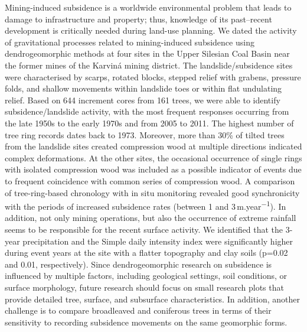 {Mining-induced subsidence is a worldwide environmental problem that leads to damage to infrastructure and property; thus, knowledge of its past–recent development is critically needed during land-use planning. We dated the activity of gravitational processes related to mining-induced subsidence using dendrogeomorphic methods at four sites in the Upper Silesian Coal Basin near the former mines of the Karviná mining district. The landslide/subsidence sites were characterised by scarps, rotated blocks, stepped relief with grabens, pressure folds, and shallow movements within landslide toes or within flat undulating relief. Based on 644 increment cores from 161 trees, we were able to identify subsidence/landslide activity, with the most frequent responses occurring from the late 1950s to the early 1970s and from 2005 to 2011. The highest number of tree ring records dates back to 1973. Moreover, more than 30\% of tilted trees from the landslide sites created compression wood at multiple directions indicated complex deformations. At the other sites, the occasional occurrence of single rings with isolated compression wood was included as a possible indicator of events due to frequent coincidence with common series of compression wood. A comparison of tree-ring-based chronology with in situ monitoring revealed good synchronicity with the periods of increased subsidence rates (between 1 and 3 m.year\textsuperscript{−1}). In addition, not only mining operations, but also the occurrence of extreme rainfall seems to be responsible for the recent surface activity. We identified that the 3-year precipitation and the Simple daily intensity index were significantly higher during event years at the site with a flatter topography and clay soils (p=0.02 and 0.01, respectively). Since dendrogeomorphic research on subsidence is influenced by multiple factors, including geological settings, soil conditions, or surface morphology, future research should focus on small research plots that provide detailed tree, surface, and subsurface characteristics. In addition, another challenge is to compare broadleaved and coniferous trees in terms of their sensitivity to recording subsidence movements on the same geomorphic forms.
}%
{}%



